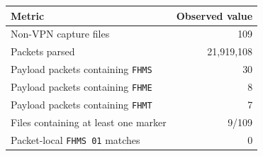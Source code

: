 \begin{tabular}{lr}
\toprule
Metric & Observed value \\
\midrule
Non-VPN capture files & 109 \\
Packets parsed & 21,919,108 \\
Payload packets containing \texttt{FHMS} & 30 \\
Payload packets containing \texttt{FHME} & 8 \\
Payload packets containing \texttt{FHMT} & 7 \\
Files containing at least one marker & 9/109 \\
Packet-local \texttt{FHMS\,01} matches & 0 \\
\bottomrule
\end{tabular}

